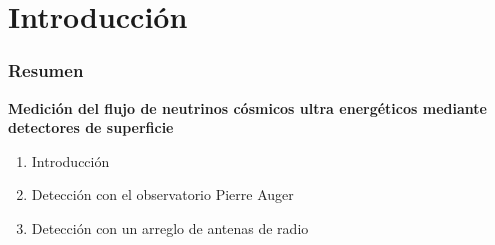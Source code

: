 \section{Introducci\'on}

\begin{frame}
 \frametitle{Resumen}
 \begin{exampleblock}{
  \begin{center}
	\textbf{Medici\'on del flujo de neutrinos c\'osmicos ultra energ\'eticos mediante detectores de superficie}
  \end{center}
  }
  \begin{enumerate}\setlength\itemsep{3mm}
   \item Introducci\'on
   \item Detecci\'on con el observatorio Pierre Auger
   \item Detecci\'on con un arreglo de antenas de radio
  \end{enumerate}

 \end{exampleblock}
\end{frame}

